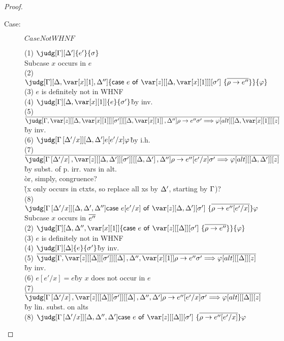 \begin{proof}
\begin{description}
\item[Case:] $CaseNotWHNF$
\begin{tabbing}
  (1) $\judg[\G][\D']{e'}{\s}$\\
  Subcase $x$ occurs in $e$\\
    (2) $\judg[\G][\D,\xl,\D'']{\ccase{e}{\z[\irr{\D,\xl}][\s']~\{\ov{\rho\to e''}\}}}{\vp}$\\
    (3) $e$ is definitely not in WHNF\\
    (4) $\judg[\G][\D,\xl]{e}{\s'}$\`by inv.\\
    (5) $\ov{\judg[\G,\zr{\irr{\D,\xl}}{\s'}][\irr{\D,\xl},\D'']{\rho\to e''}{\s' \Longrightarrow \vp}[alt][\irr{\D,\xl}][z]}$\`by inv.\\
    (6) $\judg[\subst{\G}{\D'}{x}][\D,\D']{e[e'/x]}{\vp}$\`by i.h.\\
    (7) $\ov{\judg[\subst{\G}{\D'}{x},\zr{\irr{\D,\D'}}{\s'}][\irr{\D,\D'},\D'']{\rho\to e''[e'/x]}{\s' \Longrightarrow \vp}[alt][\irr{\D,\D'}][z]}$\\
    \` by subst. of p. irr. vars in alt.\\
    \` or, simply, congruence? \\
    \` (x only occurs in ctxts, so replace all xs by $\Delta'$, starting by $\Gamma$)?\\
    (8) $\judg[\subst{\G}{\D'}{x}][\D,\D',\D'']{\ccase{e[e'/x]}{\z[\D,\D'][\s']~\{\ov{\rho\to e''[e'/x]}\}}}{\vp}$\\
  Subcase $x$ occurs in $\overline{e''}$\\
    (2) $\judg[\G][\D,\D'',\xl]{\ccase{e}{\z[\irr{\D}][\s']~\{\ov{\rho\to e''}\}}}{\vp}$\\
    (3) $e$ is definitely not in WHNF\\
    (4) $\judg[\G][\D]{e}{\s'}$\`by inv.\\
    (5) $\ov{\judg[\G,\zr{\irr{\D}}{\s'}][\irr{\D},\D'',\xl]{\rho\to e''}{\s' \Longrightarrow \vp}[alt][\irr{\D}][z]}$\`by inv.\\
    (6) $e[e'/x] = e$\` by $x$ does not occur in $e$\\
    (7) $\ov{\judg[\subst{\G}{\D'}{x},\zr{\irr{\D}}{\s'}][\irr{\D},\D'',\D']{\rho\to e''[e'/x]}{\s' \Longrightarrow \vp}[alt][\irr{\D}][z]}$\`by lin. subst. on alts\\
    (8) $\judg[\subst{\G}{\D'}{x}][\D,\D'',\D']{\ccase{e}{\z[\irr{\D}][\s']~\{\ov{\rho\to e''[e'/x]}\}}}{\vp}$\\
\end{tabbing}



\end{description}
\end{proof}

